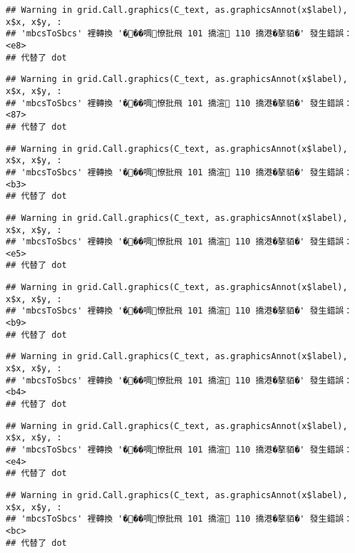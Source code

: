 \documentclass[
]{article}
\begin{document}
\begin{verbatim}
## Warning in grid.Call.graphics(C_text, as.graphicsAnnot(x$label), x$x, x$y, :
## 'mbcsToSbcs' 裡轉換 '���啁憭批飛 101 撟渲 110 撟港�摮貊�' 發生錯誤：<e8>
## 代替了 dot
\end{verbatim}

\begin{verbatim}
## Warning in grid.Call.graphics(C_text, as.graphicsAnnot(x$label), x$x, x$y, :
## 'mbcsToSbcs' 裡轉換 '���啁憭批飛 101 撟渲 110 撟港�摮貊�' 發生錯誤：<87>
## 代替了 dot
\end{verbatim}

\begin{verbatim}
## Warning in grid.Call.graphics(C_text, as.graphicsAnnot(x$label), x$x, x$y, :
## 'mbcsToSbcs' 裡轉換 '���啁憭批飛 101 撟渲 110 撟港�摮貊�' 發生錯誤：<b3>
## 代替了 dot
\end{verbatim}

\begin{verbatim}
## Warning in grid.Call.graphics(C_text, as.graphicsAnnot(x$label), x$x, x$y, :
## 'mbcsToSbcs' 裡轉換 '���啁憭批飛 101 撟渲 110 撟港�摮貊�' 發生錯誤：<e5>
## 代替了 dot
\end{verbatim}

\begin{verbatim}
## Warning in grid.Call.graphics(C_text, as.graphicsAnnot(x$label), x$x, x$y, :
## 'mbcsToSbcs' 裡轉換 '���啁憭批飛 101 撟渲 110 撟港�摮貊�' 發生錯誤：<b9>
## 代替了 dot
\end{verbatim}

\begin{verbatim}
## Warning in grid.Call.graphics(C_text, as.graphicsAnnot(x$label), x$x, x$y, :
## 'mbcsToSbcs' 裡轉換 '���啁憭批飛 101 撟渲 110 撟港�摮貊�' 發生錯誤：<b4>
## 代替了 dot
\end{verbatim}

\begin{verbatim}
## Warning in grid.Call.graphics(C_text, as.graphicsAnnot(x$label), x$x, x$y, :
## 'mbcsToSbcs' 裡轉換 '���啁憭批飛 101 撟渲 110 撟港�摮貊�' 發生錯誤：<e4>
## 代替了 dot
\end{verbatim}

\begin{verbatim}
## Warning in grid.Call.graphics(C_text, as.graphicsAnnot(x$label), x$x, x$y, :
## 'mbcsToSbcs' 裡轉換 '���啁憭批飛 101 撟渲 110 撟港�摮貊�' 發生錯誤：<bc>
## 代替了 dot
\end{verbatim}
\end{document}
